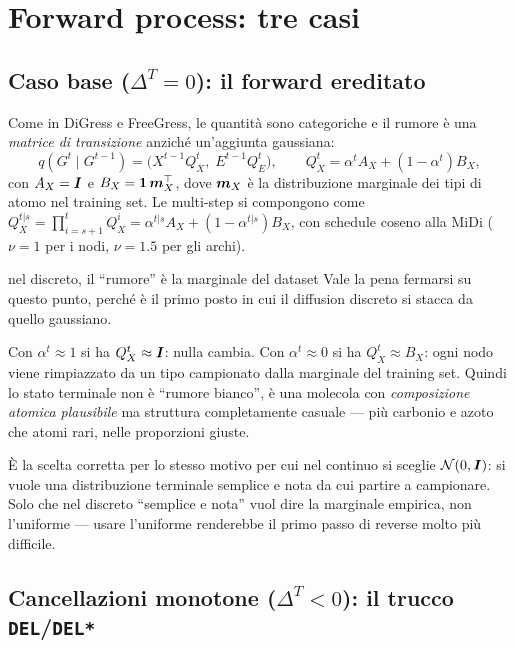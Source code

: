\section{Forward process: tre casi}

\subsection{Caso base ($\Delta^T = 0$): il forward ereditato}

Come in DiGress e FreeGress, le quantità sono categoriche e il rumore è una \emph{matrice di transizione} anziché un'aggiunta gaussiana:
\[
q(G^t \mid G^{t-1}) = \big(X^{t-1} Q_X^t,\; E^{t-1} Q_E^t\big),
\qquad
Q_X^t = \alpha^t A_X + (1-\alpha^t) B_X,
\]
con $A_X = \bm{I}$ e $B_X = \bm{1}\, \bm{m}_X^\top$, dove $\bm{m}_X$ è la distribuzione marginale dei tipi di atomo nel training set. Le multi-step si compongono come $Q_X^{t|s} = \prod_{i=s+1}^{t} Q_X^i = \alpha^{t|s} A_X + (1-\alpha^{t|s})B_X$, con schedule coseno alla MiDi ($\nu = 1$ per i nodi, $\nu = 1.5$ per gli archi).

\begin{intuizione}{nel discreto, il ``rumore'' è la marginale del dataset}
Vale la pena fermarsi su questo punto, perché è il primo posto in cui il diffusion discreto si stacca da quello gaussiano.

Con $\alpha^t \approx 1$ si ha $Q_X^t \approx \bm{I}$: nulla cambia. Con $\alpha^t \approx 0$ si ha $Q_X^t \approx B_X$: ogni nodo viene rimpiazzato da un tipo campionato dalla marginale del training set. Quindi lo stato terminale non è ``rumore bianco'', è una molecola con \emph{composizione atomica plausibile} ma struttura completamente casuale — più carbonio e azoto che atomi rari, nelle proporzioni giuste.

È la scelta corretta per lo stesso motivo per cui nel continuo si sceglie $\mathcal{N}(0,\bm{I})$: si vuole una distribuzione terminale semplice e nota da cui partire a campionare. Solo che nel discreto ``semplice e nota'' vuol dire la marginale empirica, non l'uniforme — usare l'uniforme renderebbe il primo passo di reverse molto più difficile.
\end{intuizione}

\subsection{Cancellazioni monotone ($\Delta^T < 0$): il trucco \texttt{DEL}/\texttt{DEL*}}


